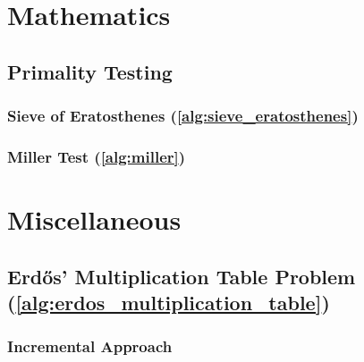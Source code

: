 \documentclass[12pt]{book}
\newcommand{\<}{\langle}
\renewcommand{\>}{\rangle}
\renewcommand{\(}{\left(}
\renewcommand{\)}{\right)}
\begin{document}
    \section{Mathematics}
        \subsection{Primality Testing}
            \subsubsection{Sieve of Eratosthenes (\ref{alg:sieve_eratosthenes})}
                

        \subsubsection{Miller Test (\ref{alg:miller})}
            

    \section{Miscellaneous}
        \subsection{Erdős' Multiplication Table Problem (\ref{alg:erdos_multiplication_table})}
            \subsubsection{Incremental Approach}
                

\printbibliography
\end{document}
